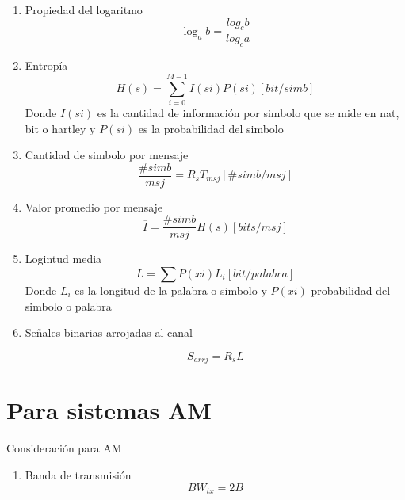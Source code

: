 \documentclass[10pt]{article}
\begin{document}
\begin{enumerate}
	

	
	\item Propiedad del logaritmo
		\begin{equation}
		\log_a{b}=\frac{log_c{b}}{log_c{a}}
	\end{equation}
	\item Entropía
	\begin{equation}
	 	H(s)=\sum_{i=0}^{M-1}I(si)P(si)[bit/simb]
	\end{equation}
	Donde $I(si)$ es la cantidad de información por simbolo que se mide en nat, bit o hartley y $P(si)$ es la probabilidad del simbolo
	\item Cantidad de simbolo por mensaje
	\begin{equation}
	\frac{\#simb}{msj}=R_sT_{msj}[\#simb/msj]
	\end{equation}
	\item Valor promedio por mensaje
	\begin{equation}
	 \overline{I}=\frac{\#simb}{msj}H(s)[bits/msj]
	\end{equation}
	 \item  Logintud media
	 \begin{equation}
	 	L=\sum P(xi)L_i[bit/palabra]
	 \end{equation}
	 Donde $L_i$ es la longitud de la palabra o simbolo y  $P(xi)$ probabilidad del simbolo o palabra
	 \item  Señales binarias arrojadas al canal
	 
	 \begin{equation}
	 	S_{arrj}=R_sL
	 \end{equation}
\end{enumerate}

\section{Para sistemas AM}
Consideración para AM
\begin{enumerate}
	\item Banda de transmisión
	\begin{equation}
		BW_{tx}=2B
	\end{equation}
\end{enumerate}
\end{document}

